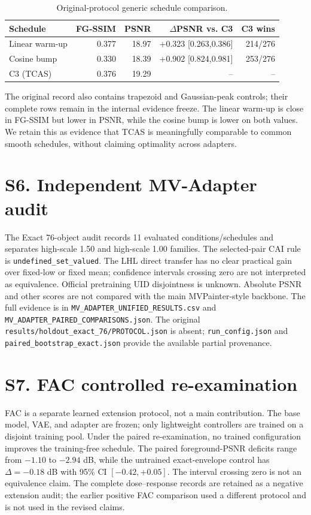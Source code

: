 \documentclass[10pt]{article}
\begin{document}
\begin{table}[h]
\centering\scriptsize
\caption{Original-protocol generic schedule comparison.}
\begin{tabular}{lrrrr}
\toprule
Schedule & FG-SSIM & PSNR & $\Delta$PSNR vs. C3 & C3 wins \\
\midrule
Linear warm-up & 0.377 & 18.97 & +0.323 [0.263,0.386] & 214/276 \\
Cosine bump & 0.330 & 18.39 & +0.902 [0.824,0.981] & 253/276 \\
C3 (TCAS) & 0.376 & 19.29 & -- & -- \\
\bottomrule
\end{tabular}
\end{table}

The original record also contains trapezoid and Gaussian-peak controls; their
complete rows remain in the internal evidence freeze. The linear warm-up is
close in FG-SSIM but lower in PSNR, while the cosine bump is lower on both
values. We retain this as evidence that TCAS is meaningfully comparable to
common smooth schedules, without claiming optimality across adapters.

\section{S6. Independent MV-Adapter audit}

The Exact 76-object audit records 11 evaluated conditions/schedules and
separates high-scale 1.50 and high-scale 1.00 families. The selected-pair CAI rule is
\texttt{undefined\_set\_valued}. The LHL direct transfer has no clear
practical gain over fixed-low or fixed mean; confidence intervals crossing
zero are not interpreted as equivalence. Official pretraining UID
disjointness is unknown. Absolute PSNR and other scores are not compared with
the main MVPainter-style backbone. The full evidence is in
\texttt{MV\_ADAPTER\_UNIFIED\_RESULTS.csv} and
\texttt{MV\_ADAPTER\_PAIRED\_COMPARISONS.json}.
The original \texttt{results/holdout\_exact\_76/PROTOCOL.json} is absent;
\texttt{run\_config.json} and \texttt{paired\_bootstrap\_exact.json} provide
the available partial provenance.

\section{S7. FAC controlled re-examination}

FAC is a separate learned extension protocol, not a main contribution. The
base model, VAE, and adapter are frozen; only lightweight controllers are
trained on a disjoint training pool. Under the paired re-examination, no
trained configuration improves the training-free schedule. The paired
foreground-PSNR deficits range from $-1.10$ to $-2.94$ dB, while the
untrained exact-envelope control has $\Delta=-0.18$ dB with 95\% CI
$[-0.42,+0.05]$. The interval crossing zero is not an equivalence claim.
The complete dose--response records are retained as a negative extension
audit; the earlier positive FAC comparison used a different protocol and is
not used in the revised claims.
\end{document}
